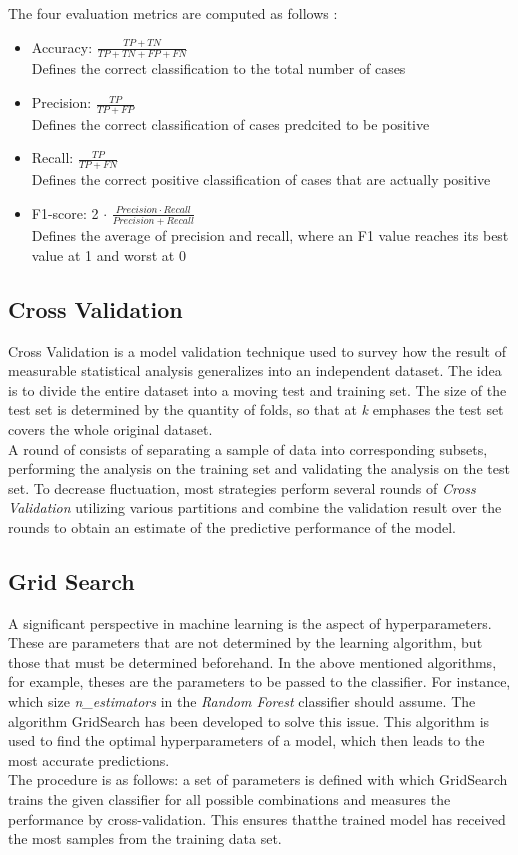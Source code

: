 \documentclass[a4paper, 11pt,titlepage,oneside,openany]{book}
\begin{document}
\noindent The four evaluation metrics are computed as follows \cite{algorithms}:
\begin{itemize}
	\item Accuracy: $\frac{TP+TN}{TP+TN+FP+FN}$\\
					Defines the correct classification to the total number of cases
	\item Precision: $\frac{TP}{TP+FP}$\\
	Defines the correct classification of cases predcited to be positive
	\item Recall: $\frac{TP}{TP+FN}$\\
	Defines the correct positive classification of cases that are actually positive
	\item F1-score: 2 $\cdot$ $\frac{Precision \cdot Recall}{Precision+Recall}$\\
	Defines the average of precision and recall,
	where an F1 value reaches its best value at 1
	and worst at 0
\end{itemize}\newpage
\subsection{Cross Validation}
Cross Validation is a model validation technique used to survey how the result of measurable statistical analysis generalizes into an independent dataset. The idea is to divide the entire dataset into a moving test and training set. The size of the test set is determined by the quantity of folds, so that at \textit{k} emphases the test set covers the whole original dataset.\\
\noindent A round of  consists of separating a sample of data into corresponding subsets, performing the analysis on the training set and validating the analysis on the test set. To decrease fluctuation, most strategies perform several rounds of \textit{Cross Validation} utilizing various partitions and combine the validation result over the rounds to obtain an estimate of the predictive performance of the model.

\subsection{Grid Search}
A significant perspective in machine learning is the aspect of hyperparameters. These are parameters that are not determined by the learning algorithm, but those that must be determined beforehand. In the above mentioned algorithms, for example, theses are the parameters to be passed to the classifier. For instance, which size \textit{n\_estimators} in the \textit{Random Forest} classifier should assume. The algorithm GridSearch has been developed to solve this issue. This algorithm is used to find the optimal hyperparameters of a model, which then leads to the most accurate predictions. \\
\noindent The procedure is as follows: a set of parameters is defined with which GridSearch trains the given classifier for all possible combinations and measures the performance by cross-validation. This ensures thatthe trained model has received the most samples from the training data set. 
\end{document}
